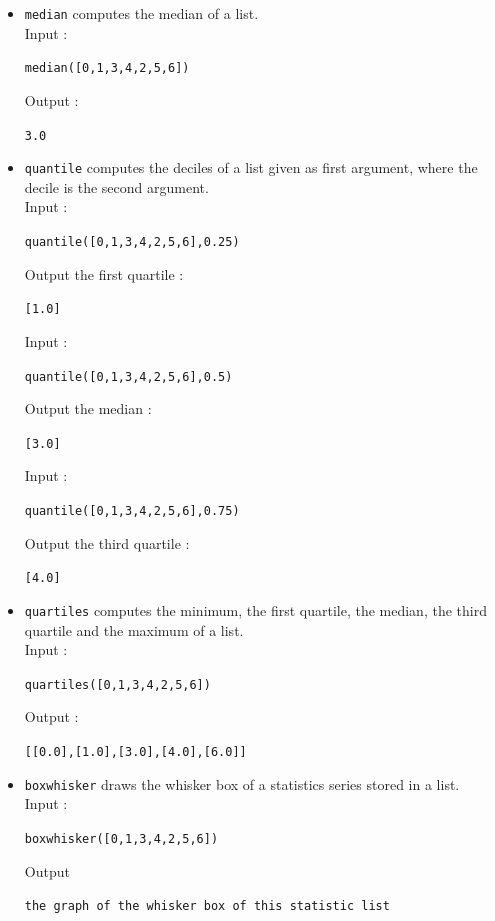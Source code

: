 \documentclass[a4paper,11pt]{book}
\begin{document}
\begin{itemize}
Output :
\begin{center}{\tt 2/3}\end{center}
\item{\tt median} computes the median of  a list.\\
Input :
\begin{center}{\tt median([0,1,3,4,2,5,6])}\end{center}
Output :
\begin{center}{\tt 3.0}\end{center}
\item{\tt quantile} computes the deciles of a list given as first
argument, where the decile is the second argument.\\
Input :
\begin{center}{\tt quantile([0,1,3,4,2,5,6],0.25)}\end{center}
Output the first quartile :
\begin{center}{\tt [1.0]}\end{center}
Input :
\begin{center}{\tt quantile([0,1,3,4,2,5,6],0.5)}\end{center}
Output the median :
\begin{center}{\tt [3.0]}\end{center}
Input :
\begin{center}{\tt quantile([0,1,3,4,2,5,6],0.75)}\end{center}
Output the third quartile :
\begin{center}{\tt [4.0]}\end{center}
\item{\tt quartiles} computes the minimum, the first quartile, the 
median, the third quartile and the maximum of a list.\\
Input :
\begin{center}{\tt quartiles([0,1,3,4,2,5,6])}\end{center}
Output :
\begin{center}{\tt [[0.0],[1.0],[3.0],[4.0],[6.0]]}\end{center}
\item{\tt boxwhisker} draws the whisker box of a statistics series
stored in a list.\\
Input :
\begin{center}{\tt  boxwhisker([0,1,3,4,2,5,6])}\end{center}
Output 
\begin{center}{\tt the graph of the whisker box of this statistic list}\end{center} 
\end{itemize}
\end{document}
